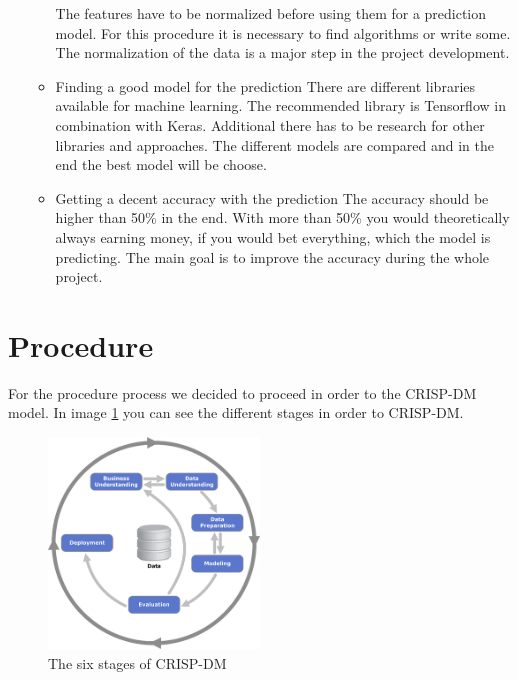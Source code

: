 \begin{itemize}
\begin{itemize}
			The features have to be normalized before using them for a prediction model. For this procedure it is necessary to find algorithms or write some. The normalization of the data is a major step in the project development.
			\item Finding a good model for the prediction 
			There are different libraries available for machine learning. The recommended library is Tensorflow in combination with Keras. Additional there has to be research for other libraries and approaches. The different models are compared and in the end the best model will be choose. 
			\item Getting a decent accuracy with the prediction \newline
			The accuracy should be higher than 50\% in the end. With more than 50\% you would theoretically always earning money, if you would bet everything, which the model is predicting. The main goal is to improve the accuracy during the whole project. 
		\end{itemize}
\end{itemize}
\section{Procedure}

For the procedure process we decided to proceed in order to the CRISP-DM model. In image \ref{CRISImage} you can see the different stages in order to CRISP-DM.

\begin{figure}[h]
\centering
\includegraphics[width=0.5\textwidth]{images/CRISP-DM_Process_Diagram1.png}
\caption{The six stages of CRISP-DM \cite{CRISPDig:2012}}
\label{CRISImage}
\end{figure}

